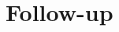 \documentclass[color=usenames,dvipsnames]{beamer}\usepackage[]{graphicx}\usepackage[]{color}
\makeatletter
\newcommand{\hlopt}[1]{\textcolor[rgb]{0,0,0}{#1}}%
\newcommand{\hlstd}[1]{\textcolor[rgb]{0,0,0}{#1}}%
\newcommand{\hlkwb}[1]{\textcolor[rgb]{0,0.341,0.682}{#1}}%
\newcommand{\hlkwc}[1]{\textcolor[rgb]{0,0,0}{\textbf{#1}}}%
\newcommand{\hlkwd}[1]{\textcolor[rgb]{0.004,0.004,0.506}{#1}}%
\newenvironment{kframe}{%
 \def\at@end@of@kframe{}%
 \ifinner\ifhmode%
  \def\at@end@of@kframe{\end{minipage}}%
  \begin{minipage}{\columnwidth}%
 \fi\fi%
 \def\FrameCommand##1{\hskip\@totalleftmargin \hskip-\fboxsep
 \colorbox{shadecolor}{##1}\hskip-\fboxsep
     \hskip-\linewidth \hskip-\@totalleftmargin \hskip\columnwidth}%
 \MakeFramed {\advance\hsize-\width
   \@totalleftmargin\z@ \linewidth\hsize
   \@setminipage}}%
 {\par\unskip\endMakeFramed%
 \at@end@of@kframe}
\newenvironment{knitrout}{}{} %
\makeatother
\begin{document}
\begin{comment}
\begin{frame}[fragile]
  \frametitle{No interaction}
  \small
\begin{knitrout}
\definecolor{shadecolor}{rgb}{0.878, 0.918, 0.933}\color{fgcolor}\begin{kframe}
\begin{alltt}
\hlstd{aov2} \hlkwb{<-} \hlkwd{aov}\hlstd{(voles} \hlopt{~} \hlstd{food} \hlopt{+} \hlstd{predators,} \hlkwc{data}\hlstd{=voleData)}
\hlkwd{summary}\hlstd{(aov2)}
\end{alltt}
\begin{verbatim}
##             Df Sum Sq Mean Sq F value   Pr(>F)    
## food         2 1337.3   668.6   16.41 6.06e-05 ***
## predators    1  975.4   975.4   23.94 8.81e-05 ***
## Residuals   20  815.0    40.8                     
## ---
## Signif. codes:  0 '***' 0.001 '**' 0.01 '*' 0.05 '.' 0.1 ' ' 1
\end{verbatim}
\end{kframe}
\end{knitrout}
\end{frame}
\end{comment}


\section{Follow-up}


\end{document}
